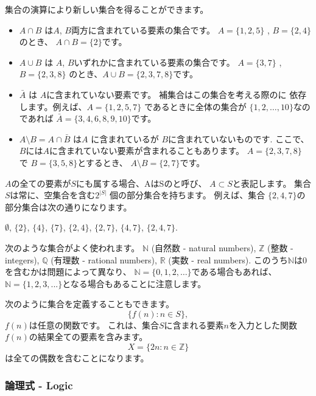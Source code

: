\begin{samepage}
集合の演算により新しい集合を得ることができます。
\begin{itemize}
\item {} $A \cap B$ は$A$, $B$両方に含まれている要素の集合です。
$A=\{1,2,5\}$ , $B=\{2,4\}$のとき、 $A \cap B = \{2\}$です。
\item {} $A \cup B$ は $A$, $B$いずれかに含まれている要素の集合です。
$A=\{3,7\}$ , $B=\{2,3,8\}$ のとき、$A \cup B = \{2,3,7,8\}$です。
\item {} $\bar A$ は $A$に含まれていない要素です。
補集合はこの集合を考える際のに
依存します。例えば、$A=\{1,2,5,7\}$ であるときに全体の集合が
$\{1,2,\ldots,10\}$なのであれば $\bar A = \{3,4,6,8,9,10\}$です。
\item {} $A \setminus B = A \cap \bar B$
は$A$ に含まれているが $B$に含まれていないものです.
ここで、$B$には$A$に含まれていない要素が含まれることもあります。
$A=\{2,3,7,8\}$ で $B=\{3,5,8\}$とするとき、
$A \setminus B = \{2,7\}$です。
\end{itemize}
\end{samepage}

$A$の全ての要素が$S$にも属する場合、AはSのと呼び、
$A \subset S$と表記します。
集合$S$は常に、空集合を含む$2^{|S|}$ 個の部分集合を持ちます。
例えば、集合 $\{2,4,7\}$の部分集合は次の通りになります。
\begin{center}
$\emptyset$,
$\{2\}$, $\{4\}$, $\{7\}$, $\{2,4\}$, $\{2,7\}$, $\{4,7\}$, $\{2,4,7\}$.
\end{center}

次のような集合がよく使われます。
$\mathbb{N}$ (自然数 - natural numbers),
$\mathbb{Z}$ (整数 - integers),
$\mathbb{Q}$ (有理数 - rational numbers), 
$\mathbb{R}$ (実数 - real numbers).
このうち$\mathbb{N}$は0を含むかは問題によって異なり、
$\mathbb{N}=\{0,1,2,\ldots\}$である場合もあれば、
$\mathbb{N}=\{1,2,3,...\}$となる場合もあることに注意します。

次のように集合を定義することもできます。
\[\{f(n) : n \in S\},\]
$f(n)$は任意の関数です。
これは、集合$S$に含まれる要素$n$を入力とした関数$f(n)$の結果全ての要素を含みます。
\[X=\{2n : n \in \mathbb{Z}\}\]
は全ての偶数を含むことになります。


\subsubsection{論理式 - Logic}

